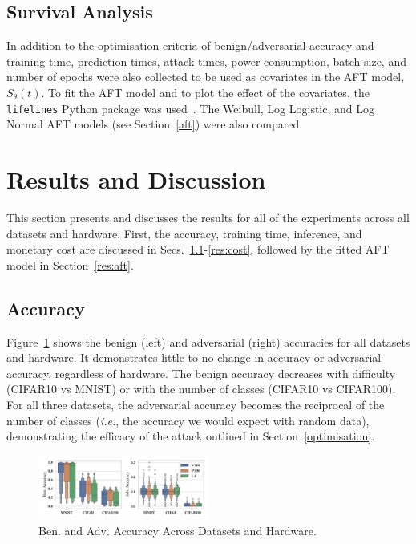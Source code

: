 \documentclass[conference]{IEEEtran}
\begin{document}
{\subsection{Survival Analysis}

In addition to the optimisation criteria of benign/adversarial accuracy and training time, prediction times, attack times, power consumption, batch size, and number of epochs were also collected to be used as covariates in the AFT model, $S_{\theta}(t)$. To fit the AFT model and to plot the effect of the covariates, the \texttt{lifelines} Python package was used~\cite{lifelines}. The Weibull, Log Logistic, and Log Normal AFT models (see Section~\ref{aft}) were also compared. 


\section{Results and Discussion}
\label{results}

This section presents and discusses the results for all of the experiments across all datasets and hardware. First, the accuracy, training time, inference, and monetary cost are discussed in Secs.~\ref{res:acc}-\ref{res:cost}, followed by the fitted AFT model in Section~\ref{res:aft}.


\subsection{Accuracy}
\label{res:acc}

Figure~\ref{fig:acc} shows the benign (left) and adversarial (right) accuracies for all datasets and hardware. It demonstrates little to no change in accuracy or adversarial accuracy, regardless of hardware. The benign accuracy decreases with difficulty (CIFAR10 vs MNIST) or with the number of classes (CIFAR10 vs CIFAR100). For all three datasets, the adversarial accuracy becomes the reciprocal of the number of classes (\textit{i.e.}, the accuracy we would expect with random data), demonstrating the efficacy of the attack outlined in Section~\ref{optimisation}.

\begin{figure}[h!]
    \centering
    \includegraphics[width=0.5\textwidth,clip]{plots/combined/acc.pdf}
    \caption{Ben. and Adv. Accuracy Across Datasets and Hardware.}
    \label{fig:acc}
\end{figure}

}
\end{document}
